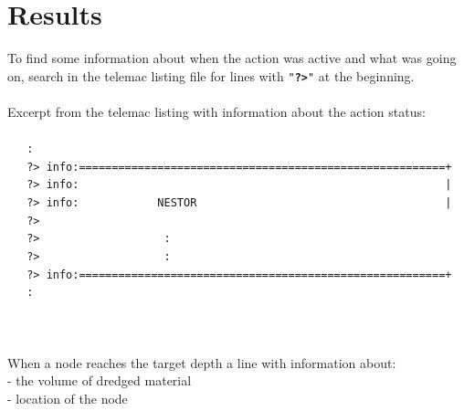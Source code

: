 \section{Results} \label{sec:E3Result}
To find some information about when the action was active and what was going on,
search in the telemac listing file for lines with \texttt{"\textbf{?>}"} at the beginning.\\
\\
Excerpt from the telemac listing with information about the action status:\\
\\~\hspace*{3mm}~\texttt{\small{~:~}}
\\~\hspace*{3mm}~\texttt{\small{~?>~info:========================================================+}}
\\~\hspace*{3mm}~\texttt{\small{~?>~info:~~~~~~~~~~~~~~~~~~~~~~~~~~~~~~~~~~~~~~~~~~~~~~~~~~~~~~~~|}}
\\~\hspace*{3mm}~\texttt{\small{~?>~info:~~~~~~~~~~~~NESTOR~~~~~~~~~~~~~~~~~~~~~~~~~~~~~~~~~~~~~~|}}
\\~\hspace*{3mm}~\texttt{\small{~?>~~~~~~~~~~~~~~~~~~~~~~~~~~~~~~~~~~~~~~~~~~~~~~~~~~~~~~~~~~~~~~~}}
\\~\hspace*{3mm}~\texttt{\small{~?>~~~~~~~~~~~~~~~~~~~:~~~~~~~~~~~~~~~~~~~~~~~~~~~~~~~~~~~~~~~~~~~~}}
\\~\hspace*{3mm}~\texttt{\small{~?>~~~~~~~~~~~~~~~~~~~:~~~~~~~~~~~~~~~~~~~~~~~~~~~~~~~~~~~~~~~~~~~~}}
\\~\hspace*{3mm}~\texttt{\small{~?>~info:========================================================+}}
\\~\hspace*{3mm}~\texttt{\small{~:~}}\\
\\
\\
\\
When a node reaches the target depth a line with information about:\\
\hspace*{3mm} - the volume of dredged material\\
\hspace*{3mm} - location of the node\\
